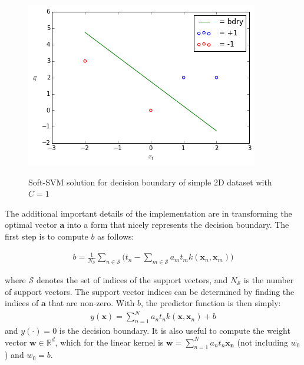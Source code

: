 \documentclass[10pt]{article}
\begin{document}



\begin{figure}
\centering
\includegraphics[scale=0.5]{svm_toy.png}
\label{svm_toy}
\caption{Soft-SVM solution for decision boundary of simple 2D dataset with $C=1$}
\end{figure}

The additional important details of the implementation are in transforming the optimal vector $\mathbf{a}$ into a form that nicely represents the decision boundary.  The first step is to compute $b$ as follows:

\begin{equation}
\begin{aligned}
b = \frac{1}{N_\mathcal{S}} \sum_{n \in \mathcal{S}} \bigg(t_n  - \sum_{m \in \mathcal{S}} a_mt_mk(\mathbf{x}_n, \mathbf{x}_m) \bigg)
\end{aligned}
\end{equation}

where $\mathcal{S}$ denotes the set of indices of the support vectors, and $N_{\mathcal{S}}$ is the number of support vectors.  The support vector indices can be determined by finding the indices of $\mathbf{a}$ that are non-zero. With $b$, the predictor function is then simply: 
\begin{equation}
\begin{aligned}
y(\mathbf{x}) = \sum_{n=1}^N a_nt_nk(\mathbf{x},\mathbf{x}_n) + b
\end{aligned}
\end{equation}
and $y(\cdot)=0$ is the decision boundary.  It is also useful to compute the weight vector $\mathbf{w} \in \mathbb{R}^d$, which for the linear kernel is $\mathbf{w} = \sum_{n=1}^{N} a_n t_n \mathbf{x_n} $ (not including $w_0$) and $w_0 = b$.
\end{document}

